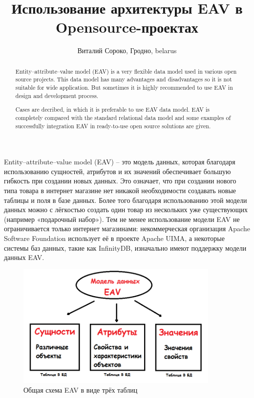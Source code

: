 \documentclass[10pt, a5paper]{article}
\begin{document}
\title{Использование архитектуры  EAV в Opensource-проектах}
\author{Виталий Сороко, Гродно, belarus}
\maketitle
\begin{abstract}
Entity–attribute–value model (EAV) is a very flexible data model used in various open source projects. This data model has many advantages and disadvantages so it is not suitable for wide application. But sometimes it is highly recommended to use EAV in design and development process.

Cases are decribed, in which it is preferable to use EAV data model. EAV is completely compared with the standard relational data model and  some examples of  successfully integration EAV in ready-to-use open source solutions are given.
\end{abstract}

Entity–attribute–value model (EAV) – это модель данных, которая благодаря использованию сущностей, атрибутов и их значений обеспечивает большую гибкость при создании новых данных. Это означает, что при создании нового типа товара в интернет магазине нет никакой необходимости создавать новые таблицы и поля в базе данных. Более того благодаря использованию этой модели данных можно с лёгкостью создать один товар из нескольких уже существующих (например «подарочный набор»). Тем не менее использование модели  EAV не ограничивается только интернет магазинами: некоммерческая организация Apache Software Foundation использует её в проекте Apache UIMA, а некоторые системы баз данных, такие как InfinityDB, изначально имеют поддержку модели данных EAV.

\begin{figure}[h!]
  \centering
  \includegraphics[width=10cm]{w_10_2016_Soroko1.png}
  \caption {Общая схема EAV в виде трёх таблиц}\label{Soroko1}
\end{figure} 
\end{document}
